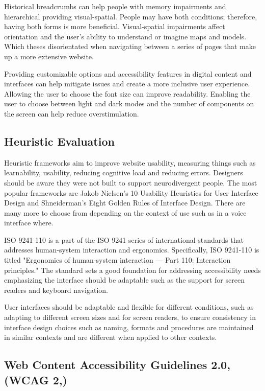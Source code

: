 \documentclass[main.tex]{subfiles}
\begin{document}
Historical breadcrumbs can help people with memory impairments and hierarchical providing visual-spatial. People may have both conditions; therefore, having both forms is more beneficial. Visual-spatial impairments affect orientation and the user's ability to understand or imagine maps and models. Which theses disorientated when navigating between a series of pages that make up a more extensive website.  

Providing customizable options and accessibility features in digital content and interfaces can help mitigate issues and create a more inclusive user experience. Allowing the user to choose the font size can improve readability. Enabling the user to choose between light and dark modes and the number of components on the screen can help reduce overstimulation. 

\subsection{Heuristic Evaluation}

Heuristic frameworks aim to improve website usability, measuring things such as learnability, usability, reducing cognitive load and reducing errors. Designers should be aware they were not built to support neurodivergent people. The most popular frameworks are Jakob Nielsen's 10 Usability Heuristics for User Interface Design and Shneiderman's Eight Golden Rules of Interface Design. There are many more to choose from depending on the context of use such as in a voice interface where.

ISO 9241-110 is a part of the ISO 9241 series of international standards that addresses human-system interaction and ergonomics. Specifically, ISO 9241-110 is titled "Ergonomics of human-system interaction — Part 110: Interaction principles." The standard sets a good foundation for addressing accessibility needs emphasizing the interface should be adaptable such as the support for screen readers and keyboard navigation.

User interfaces should be adaptable and flexible for different conditions, such as adapting to different screen sizes and for screen readers, to ensure consistency in interface design choices such as naming, formats and procedures are maintained in similar contexts and are different when applied to other contexts. 

\subsection{Web Content Accessibility Guidelines 2.0,(WCAG 2,)}
\end{document}
